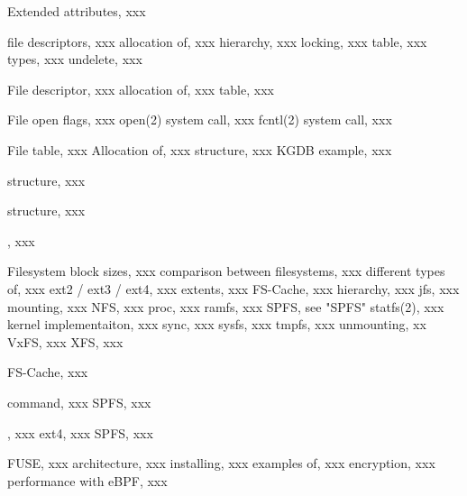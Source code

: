 \begin{theindex}
 \indexspace
	 \item Extended attributes, xxx

\indexspace
	 \item file
	 	\subitem descriptors, xxx
			\subsubitem allocation of, xxx
		\subitem hierarchy, xxx
		\subitem locking, xxx
		\subitem table, xxx
		\subitem types, xxx
	 	\subitem undelete, xxx

\indexspace
	 \item File descriptor, xxx
	 	\subitem allocation of, xxx
		\subitem table, xxx

\indexspace
 	\item File open flags, xxx
 		\subitem open(2) system call, xxx
		\subitem fcntl(2) system call, xxx

\indexspace
	 \item File table, xxx
 		\subitem Allocation of, xxx
 		\subitem {} structure, xxx
		\subitem KGDB example, xxx

\indexspace
 	\item {} structure, xxx

\indexspace
 	\item {} structure, xxx

\indexspace
	 \item {}, xxx

\indexspace
	 \item Filesystem
	 	\subitem block sizes, xxx
		\subitem comparison between filesystems, xxx
		\subitem different types of, xxx
		\subitem ext2 / ext3 / ext4, xxx
		\subitem extents, xxx
		\subitem FS-Cache, xxx
		\subitem hierarchy, xxx
		\subitem jfs, xxx
		\subitem mounting, xxx
		\subitem NFS, xxx
		\subitem proc, xxx
		\subitem ramfs, xxx
		\subitem SPFS, see "SPFS"
		\subitem statfs(2), xxx
			\subsubitem kernel implementaiton, xxx
		\subitem sync, xxx
		\subitem sysfs, xxx
		\subitem tmpfs, xxx
		\subitem unmounting, xx
		\subitem VxFS, xxx
		\subitem XFS, xxx

\indexspace
	 \item FS-Cache, xxx

\indexspace
	 \item {} command, xxx
		\subitem SPFS, xxx

\indexspace
	 \item {}, xxx
	 	\subitem ext4, xxx
		\subitem SPFS, xxx

\indexspace
	 \item FUSE, xxx
	 	\subitem architecture, xxx
	 	\subitem installing, xxx
		\subitem examples of, xxx
		\subitem encryption, xxx	
		\subitem performance with eBPF, xxx	


\end{theindex}
